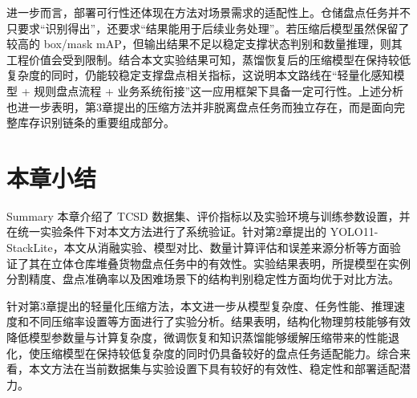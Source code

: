 进一步而言，部署可行性还体现在方法对场景需求的适配性上。仓储盘点任务并不只要求“识别得出”，还要求“结果能用于后续业务处理”。若压缩后模型虽然保留了较高的 box/mask mAP，但输出结果不足以稳定支撑状态判别和数量推理，则其工程价值会受到限制。结合本文实验结果可知，蒸馏恢复后的压缩模型在保持较低复杂度的同时，仍能较稳定支撑盘点相关指标，这说明本文路线在“轻量化感知模型 + 规则盘点流程 + 业务系统衔接”这一应用框架下具备一定可行性。上述分析也进一步表明，第3章提出的压缩方法并非脱离盘点任务而独立存在，而是面向完整库存识别链条的重要组成部分。

\section{本章小结}{Summary}
本章介绍了 TCSD 数据集、评价指标以及实验环境与训练参数设置，并在统一实验条件下对本文方法进行了系统验证。针对第2章提出的 YOLO11-StackLite，本文从消融实验、模型对比、数量计算评估和误差来源分析等方面验证了其在立体仓库堆叠货物盘点任务中的有效性。实验结果表明，所提模型在实例分割精度、盘点准确率以及困难场景下的结构判别稳定性方面均优于对比方法。

针对第3章提出的轻量化压缩方法，本文进一步从模型复杂度、任务性能、推理速度和不同压缩率设置等方面进行了实验分析。结果表明，结构化物理剪枝能够有效降低模型参数量与计算复杂度，微调恢复和知识蒸馏能够缓解压缩带来的性能退化，使压缩模型在保持较低复杂度的同时仍具备较好的盘点任务适配能力。综合来看，本文方法在当前数据集与实验设置下具有较好的有效性、稳定性和部署适配潜力。
